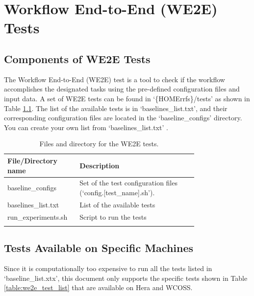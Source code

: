 \documentclass[11pt,fleqn]{report}              %
\begin{document}
\chapter{Workflow End-to-End (WE2E) Tests}                 
\label{chpt:wflow_we2e}

\section{Components of WE2E Tests}
\label{sec:we2e_comp}

The Workflow End-to-End (WE2E) test is a tool to check if the workflow accomplishes the designated tasks using the pre-defined configuration files and input data. A set of WE2E tests can be found in `\{HOMErrfs\}/tests' as shown in Table \ref{table:we2e_dir}. The list of the available tests is in `baselines\_list.txt', and their corresponding configuration files are located in the `baseline\_configs' directory. You can create your own list from `baselines\_list.txt' .

{
\fontsize{10}{12}\selectfont
\begin{longtable}{ p{0.22\linewidth} | p{0.55\linewidth} }
\hline
\hline
File/Directory name & Description \\
\hline
 baseline\_configs & Set of the test configuration files (`config.[test\_name].sh'). \\
 baselines\_list.txt & List of the available tests  \\
 run\_experiments.sh & Script to run the tests \\
\hline
\caption{Files and directory for the WE2E tests.}
\label{table:we2e_dir}
\end{longtable}
}



\section{Tests Available on Specific Machines}
\label{sec:we2e_available}

Since it is computationally too expensive to run all the tests listed in `baseline\_list.xtx', this document only supports the specific tests shown in Table \ref{table:we2e_test_list} that are available on Hera and WCOSS.
\end{document}
